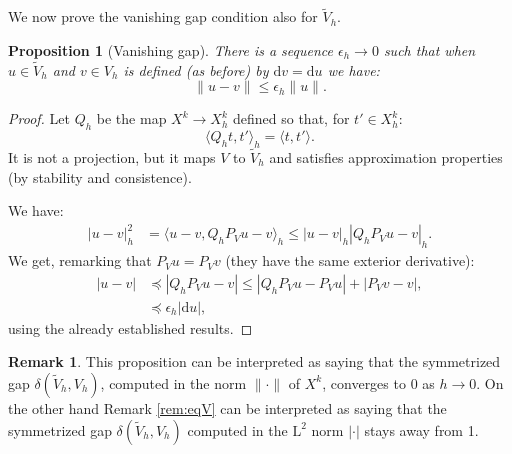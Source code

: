 \documentclass[10pt,a4paper]{article}
\newcommand{\rmd}{\mathrm{d}}
\newcommand{\rmL}{\mathrm{L}}
\newcommand{\cleq}{\preccurlyeq}
\newtheorem{proposition}[theorem]{Proposition}
\theoremstyle{remark}
\theoremstyle{definition}
\newtheorem{remark}{Remark}[section]
\numberwithin{equation}{section}
\begin{document}
We now prove the vanishing gap condition also for $\widetilde V_h$.
 \begin{proposition}[Vanishing gap]
  There is a sequence $\epsilon_h \to 0$ such that when $u \in \widetilde V_h$ and $v \in V_h$ is defined (as before) by $\rmd v = \rmd u$ we have:
  \begin{equation}
    \| u - v\| \leq \epsilon_h \| u\|.
  \end{equation}
\end{proposition}
\begin{proof}
  Let $Q_h$ be the map $X^k \to X^k_h$ defined so that, for $t' \in X^k_h$:
  \begin{equation}
    \langle Q_h t,t' \rangle_h = \langle t, t'\rangle. 
  \end{equation}
  It is not a projection, but it maps $V$ to $\widetilde V_h$ and satisfies approximation properties (by stability and consistence).
  
We have:
\begin{align}
  |u - v|^2_h & = \langle u - v, Q_h P_V u - v \rangle_h \leq | u-v |_h |Q_h P_V u - v|_h.
\end{align}
We get, remarking that $P_V u = P_V v$ (they have the same exterior derivative):
\begin{align}
  |u -v| & \cleq |Q_h P_V u - v| \leq |Q_h P_V u - P_V u| + |P_V v - v|,\\
  & \cleq \epsilon_h | \rmd u|,
\end{align}
using the already established results.
\end{proof}

\begin{remark}
  This proposition can be interpreted as saying that the symmetrized gap $\delta(\widetilde V_h, V_h)$, computed in the norm $\| \cdot \|$ of $X^k$, converges to $0$ as $h \to 0$. On the other hand Remark \ref{rem:eqV} can be interpreted as saying that the symmetrized gap $\delta(\widetilde V_h, V_h)$ computed in the $\rmL^2$ norm $| \cdot|$ stays away from 1.
\end{remark}

  
{}

\end{document}

